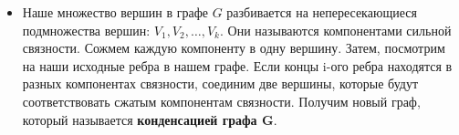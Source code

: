 \begin{itemize}
\begin{itemize}
	\item
	Наше множество вершин в графе $G$ разбивается на непересекающиеся подмножества вершин: $V_1, V_2, \dots, V_k$. Они называются компонентами сильной связности. Сожмем каждую компоненту в одну вершину. Затем, посмотрим на наши исходные ребра в нашем графе. Если концы i-ого ребра находятся в разных компонентах связности, соединим две вершины, которые будут соответствовать сжатым компонентам связности. Получим новый граф, который называется \textbf{конденсацией графа G}.
	\end{itemize}

\end{itemize}